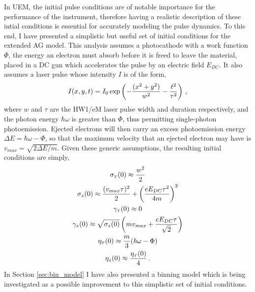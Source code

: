 In UEM, the initial pulse conditions are of notable importance for the performance of the instrument, therefore having a realistic description of these intial conditions is essential for accurately modeling the pulse dynamics.
To this end, I have presented a simplistic but useful set of initial conditions for the extended AG model.
This analysis assumes a photocathode with a work function $\Phi$, the energy an electron must absorb before it is freed to leave the material, placed in a DC gun which accelerates the pulse by an electric field $E_{DC}$.
It also assumes a laser pulse whose intensity $I$ is of the form,
\begin{equation}
  I ( x , y , t ) = I_{0} \exp \left ( - \frac{ ( x^{2} +y^{2} ) }{ w^{2} } - \frac{ t^{ 2 } }{ \tau^{ 2 } } \right ) \, \text{,}
\end{equation}
where $w$ and $\tau$ are the HW1/eM laser pulse width and duration respectively, and the photon energy $\hbar \omega$ is greater than $\Phi$, thus permitting single-photon photoemission.
Ejected electrons will then carry an excess photoemission energy $\Delta E = \hbar \omega - \Phi$, so that the maximum velocity that an ejected electron may have is $ v_{max} = \sqrt{ 2 \Delta E / m } $.
Given these generic assumptions, the resulting initial conditions are simply,
\begin{subequations}
  \begin{gather}
    \sigma_{ {\scriptscriptstyle T} } ( 0 ) \approx \frac{ w^{ 2 } }{ 2 } \\
    \sigma_{ z } ( 0 ) \approx \frac{ ( v_{max} \tau )^{ 2 } }{ 2 } + \left ( \frac{ e E_{ DC } \tau^{ 2 } }{ 4 m } \right )^{ 2 } \\
    \gamma_{ {\scriptscriptstyle T} } ( 0 ) \approx 0 \\
    \gamma_{ z } ( 0 ) \approx \sqrt{ \sigma_{ z } ( 0 ) } \left ( m v_{max} + \frac{ e E_{DC} \tau }{ \sqrt{ 2 } } \right ) \\
    \eta_{ {\scriptscriptstyle T} } ( 0 ) \approx \frac{ m }{ 3 } ( \hbar \omega - \Phi ) \\
    \eta_{ z } ( 0 ) \approx \frac{ \eta_{ {\scriptscriptstyle T} } ( 0 ) }{ 4 } \, \text{.}
  \end{gather}
\end{subequations}
In Section \ref{sec:bin_model} I have also presented a binning model which is being investigated as a possible improvement to this simplistic set of initial conditions.


